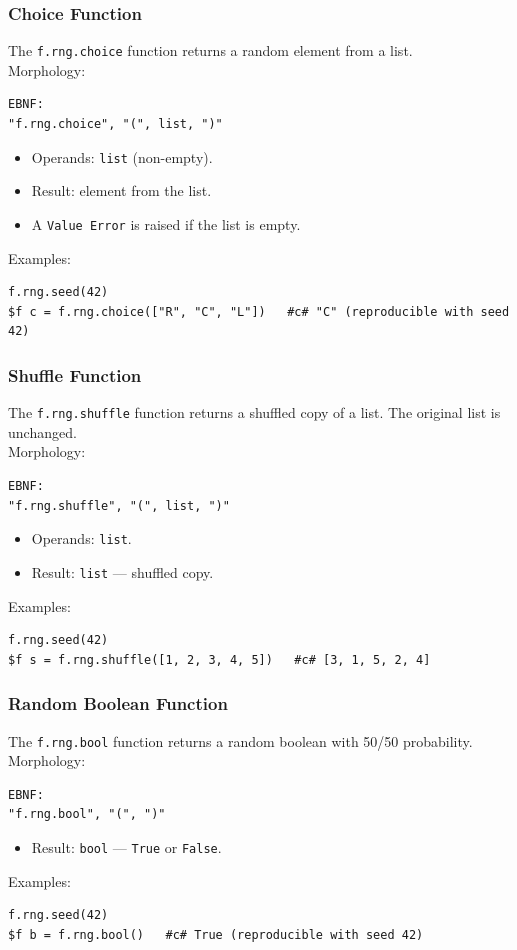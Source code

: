 \subsubsection{Choice Function}
The \texttt{f.rng.choice} function returns a random element from a list. \\
Morphology:
\begin{verbatim}
EBNF:
"f.rng.choice", "(", list, ")"
\end{verbatim}
\begin{itemize}
\item Operands: \texttt{list} (non-empty).
\item Result: element from the list.
\item A \texttt{Value Error} is raised if the list is empty.
\end{itemize}
Examples:
\begin{verbatim}
f.rng.seed(42)
$f c = f.rng.choice(["R", "C", "L"])   #c# "C" (reproducible with seed 42)
\end{verbatim}

\subsubsection{Shuffle Function}
The \texttt{f.rng.shuffle} function returns a shuffled copy of a list. The original list is unchanged. \\
Morphology:
\begin{verbatim}
EBNF:
"f.rng.shuffle", "(", list, ")"
\end{verbatim}
\begin{itemize}
\item Operands: \texttt{list}.
\item Result: \texttt{list} --- shuffled copy.
\end{itemize}
Examples:
\begin{verbatim}
f.rng.seed(42)
$f s = f.rng.shuffle([1, 2, 3, 4, 5])   #c# [3, 1, 5, 2, 4]
\end{verbatim}

\subsubsection{Random Boolean Function}
The \texttt{f.rng.bool} function returns a random boolean with 50/50 probability. \\
Morphology:
\begin{verbatim}
EBNF:
"f.rng.bool", "(", ")"
\end{verbatim}
\begin{itemize}
\item Result: \texttt{bool} --- \texttt{True} or \texttt{False}.
\end{itemize}
Examples:
\begin{verbatim}
f.rng.seed(42)
$f b = f.rng.bool()   #c# True (reproducible with seed 42)
\end{verbatim}

